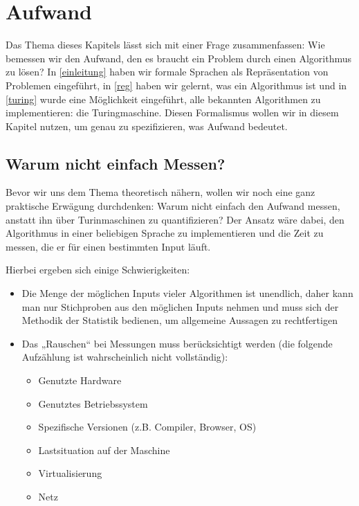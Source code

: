 \chapter{Aufwand}
Das Thema dieses Kapitels lässt sich mit einer Frage zusammenfassen:
Wie bemessen wir den Aufwand,
den es braucht ein Problem durch einen Algorithmus zu lösen?
In \autoref{einleitung} haben wir formale Sprachen als Repräsentation von Problemen eingeführt,
in \autoref{reg} haben wir gelernt, was ein Algorithmus ist und
in \autoref{turing} wurde eine Möglichkeit eingeführt,
alle bekannten Algorithmen zu implementieren:
die Turingmaschine.
Diesen Formalismus wollen wir in diesem Kapitel nutzen,
um genau zu spezifizieren,
was Aufwand bedeutet.

\section{Warum nicht einfach Messen?}\label{messenVsBeweisen}

Bevor wir uns dem Thema theoretisch nähern,
wollen wir noch eine ganz praktische Erwägung durchdenken:
Warum nicht einfach den Aufwand messen,
anstatt ihn über Turinmaschinen zu quantifizieren?
Der Ansatz wäre dabei,
den Algorithmus in einer beliebigen Sprache zu implementieren
und die Zeit zu messen,
die er für einen bestimmten Input läuft.

Hierbei ergeben sich einige Schwierigkeiten:
\begin{itemize}
  \item Die Menge der möglichen Inputs vieler Algorithmen ist unendlich,
      daher kann man nur Stichproben aus den möglichen Inputs nehmen
        und muss sich der Methodik der Statistik bedienen,
        um allgemeine Aussagen zu rechtfertigen
    \item Das „Rauschen“ bei Messungen muss berücksichtigt werden
        (die folgende Aufzählung ist wahrscheinlich nicht vollständig):
      \begin{itemize}
          \item Genutzte Hardware
          \item Genutztes Betriebssystem
          \item Spezifische Versionen (z.B. Compiler, Browser, OS)
          \item Lastsituation auf der Maschine
          \item Virtualisierung
          \item Netz
      \end{itemize}
\end{itemize}

